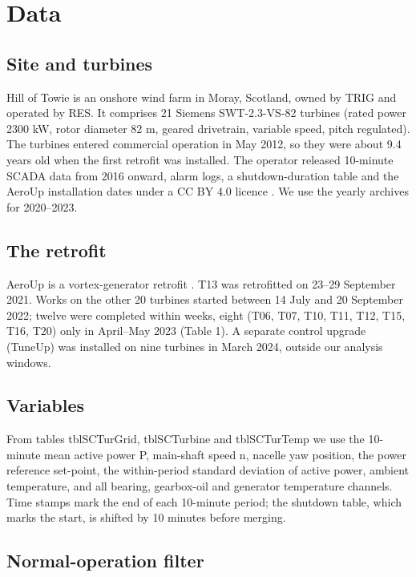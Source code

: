 \documentclass[preprint,12pt]{elsarticle}
\begin{document}
\section{Data}

\subsection{Site and turbines}

Hill of Towie is an onshore wind farm in Moray, Scotland, owned by TRIG and operated by RES. It comprises 21 Siemens SWT-2.3-VS-82 turbines (rated power 2300 kW, rotor diameter 82 m, geared drivetrain, variable speed, pitch regulated). The turbines entered commercial operation in May 2012, so they were about 9.4 years old when the first retrofit was installed. The operator released 10-minute SCADA data from 2016 onward, alarm logs, a shutdown-duration table and the AeroUp installation dates under a CC BY 4.0 licence \cite{hot}. We use the yearly archives for 2020--2023.

\subsection{The retrofit}

AeroUp is a vortex-generator retrofit \cite{clerc}. T13 was retrofitted on 23--29 September 2021. Works on the other 20 turbines started between 14 July and 20 September 2022; twelve were completed within weeks, eight (T06, T07, T10, T11, T12, T15, T16, T20) only in April--May 2023 (Table 1). A separate control upgrade (TuneUp) was installed on nine turbines in March 2024, outside our analysis windows.

\subsection{Variables}

From tables tblSCTurGrid, tblSCTurbine and tblSCTurTemp we use the 10-minute mean active power P, main-shaft speed n, nacelle yaw position, the power reference set-point, the within-period standard deviation of active power, ambient temperature, and all bearing, gearbox-oil and generator temperature channels. Time stamps mark the end of each 10-minute period; the shutdown table, which marks the start, is shifted by 10 minutes before merging.

\subsection{Normal-operation filter}
\end{document}
